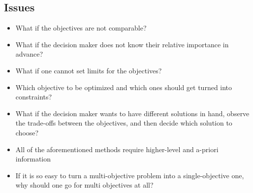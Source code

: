 \documentclass[10pt]{article}
\begin{document}
\subsection{Issues}
\begin{itemize}
    \item What if the objectives are not comparable?
    \item What if the decision maker does not know their relative importance in advance?
    \item What if one cannot set limits for the objectives?
    \item Which objective to be optimized and which ones should get turned into constraints?
    \item What if the decision maker wants to have different solutions in hand, observe the trade-offs between the objectives, and then decide which solution to choose?
    \item All of the aforementioned methods require higher-level and a-priori information
    \item If it is so easy to turn a multi-objective problem into a single-objective one, why should one go for multi objectives at all?
\end{itemize}
\newpage 
\end{document}
